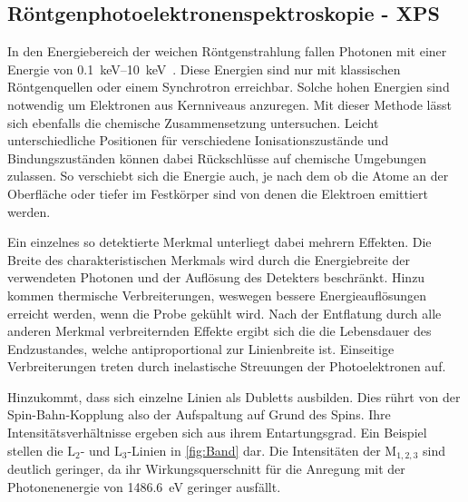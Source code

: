         \subsection{Röntgenphotoelektronenspektroskopie - XPS}
            In den Energiebereich der weichen Röntgenstrahlung fallen Photonen mit einer Energie von \SIrange{0.1}{10}{\kilo\electronvolt}~\cite{Fauster}.
            Diese Energien sind nur mit klassischen Röntgenquellen oder einem Synchrotron erreichbar.
            Solche hohen Energien sind notwendig um Elektronen aus Kernniveaus anzuregen.
            Mit dieser Methode lässt sich ebenfalls die chemische Zusammensetzung untersuchen.
            Leicht unterschiedliche Positionen für verschiedene Ionisationszustände und Bindungszuständen können dabei Rückschlüsse auf chemische Umgebungen zulassen.
            So verschiebt sich die Energie auch, je nach dem ob die Atome an der Oberfläche oder tiefer im Festkörper sind von denen die Elektroen emittiert werden.

            Ein einzelnes so detektierte Merkmal unterliegt dabei mehrern Effekten. 
            Die Breite des charakteristischen Merkmals wird durch die Energiebreite der verwendeten Photonen und der Auflösung des Detekters beschränkt.
            Hinzu kommen thermische Verbreiterungen, weswegen bessere Energieauflösungen erreicht werden, wenn die Probe gekühlt wird.
            Nach der Entflatung durch alle anderen Merkmal verbreiternden Effekte ergibt sich die die Lebensdauer des Endzustandes, welche antiproportional zur Linienbreite ist.
            Einseitige Verbreiterungen treten durch inelastische Streuungen der Photoelektronen auf.

            Hinzukommt, dass sich einzelne Linien als Dubletts ausbilden.
            Dies rührt von der Spin-Bahn-Kopplung also der Aufspaltung auf Grund des Spins.
            Ihre Intensitätsverhältnisse ergeben sich aus ihrem Entartungsgrad. 
            Ein Beispiel stellen die $\text{L}_2$- und $\text{L}_3$-Linien in \autoref{fig:Band} dar.
            Die Intensitäten der $\text{M}_{1,2,3}$ sind deutlich geringer, da ihr Wirkungsquerschnitt für die Anregung mit der Photonenenergie von \SI{1486.6}{\electronvolt} geringer ausfällt.
        
